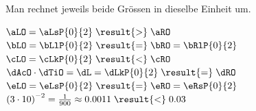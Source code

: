 Man rechnet jeweils beide Grössen in dieselbe Einheit um.
\begin{abcliste}
\abc $\aLO = \aLsP{0}{2} \;\result{>}\; \aRO$
\abc $\bLO = \bLlP{0}{2} \;\result{=}\; \bRO = \bRlP{0}{2}$
\abc $\cLO = \cLkP{0}{2} \;\result{<}\; \cRO$
\abc $\dAcO\cdot\dTiO = \dL = \dLkP{0}{2} \;\result{=}\; \dRO$
\abc $\eLO = \eLsP{0}{2} \;\result{=}\; \eRO = \eRsP{0}{2}$
\abc $\left(3\cdot 10\right)^{-2} = \frac{1}{900} \approx 0.0011 \;\result{<}\; 0.03$
\end{abcliste}
